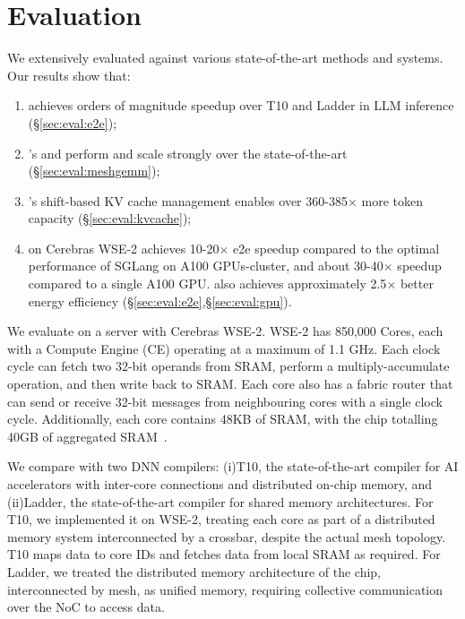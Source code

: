 \vspace{-0.3cm}
\section{Evaluation}
\vspace{-0.2cm}

We extensively evaluated \sys against various state-of-the-art methods and systems. Our results show that:
\begin{enumerate}[label=(\arabic*), leftmargin=0.5cm, noitemsep,topsep=0pt]
\item \sys achieves orders of magnitude speedup over T10 and Ladder in LLM inference (\S\ref{sec:eval:e2e});
\item \sys{}'s 
\gemm and \gemv perform and scale strongly over the state-of-the-art (\S\ref{sec:eval:meshgemm});
\item \sys's shift-based KV cache management enables over 360-385$\times$ more token capacity (\S\ref{sec:eval:kvcache});
\item \sys on Cerebras WSE-2 achieves 10-20$\times$ e2e speedup compared to the optimal performance of SGLang on A100 GPUs-cluster, and about 30-40$\times$ speedup compared to a single A100 GPU. \sys also achieves approximately 2.5$\times$ better energy efficiency (\S\ref{sec:eval:e2e},\S\ref{sec:eval:gpu}).
\end{enumerate}

We evaluate \sys on a server with Cerebras WSE-2. WSE-2 has 850,000 Cores, each with a Compute Engine (CE) operating at a maximum of 1.1 GHz. Each clock cycle can fetch two 32-bit operands from SRAM, perform a multiply-accumulate operation, and then write back to SRAM. Each core also has a fabric router that can send or receive 32-bit messages from neighbouring cores with a single clock cycle. Additionally, each core contains 48KB of SRAM, with the chip totalling 40GB of aggregated SRAM~\cite{wse}.

We compare \sys with two DNN compilers: (i)T10\cite{t10}, the state-of-the-art compiler for AI accelerators with inter-core connections and distributed on-chip memory, and (ii)Ladder\cite{ladder}, the state-of-the-art compiler for shared memory architectures. For T10, we implemented it on WSE-2, treating each core as part of a distributed memory system interconnected by a crossbar, despite the actual mesh topology. T10 maps data to core IDs and fetches data from local SRAM as required. For Ladder, we treated the distributed memory architecture of the chip, interconnected by mesh, as unified memory, requiring collective communication over the NoC to access data.

